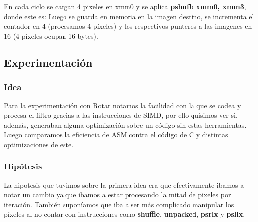 En cada ciclo se cargan 4 pixeles en xmm0 y se aplica \textbf{pshufb xmm0, xmm3}, donde este es:
Luego se guarda en memoria en la imagen destino, se incrementa el contador en 4 (procesamos 4 píxeles) y los respectivos punteros a las imagenes en 16 (4 píxeles ocupan 16 bytes).	
	
	
\subsection{Experimentación}
\subsubsection{Idea}	


Para la experimentación con Rotar notamos la facilidad con la que se codea y procesa el filtro gracias a las instrucciones de SIMD, por ello quisimos ver si, además, generaban alguna optimización sobre un código sin estas herramientas.
Luego comparamos la eficiencia de ASM contra el código de C y distintas optimizaciones de este.
\subsubsection{Hipótesis}
La hipotesis que tuvimos sobre la primera idea era que efectivamente ibamos a notar un cambio ya que ibamos a estar procesando la mitad de pixeles por iteración. También suponíamos que iba a ser más complicado manipular los píxeles al no contar con instrucciones como \textbf{shuffle}, \textbf{unpacked}, \textbf{psrlx} y \textbf{psllx}.
	
